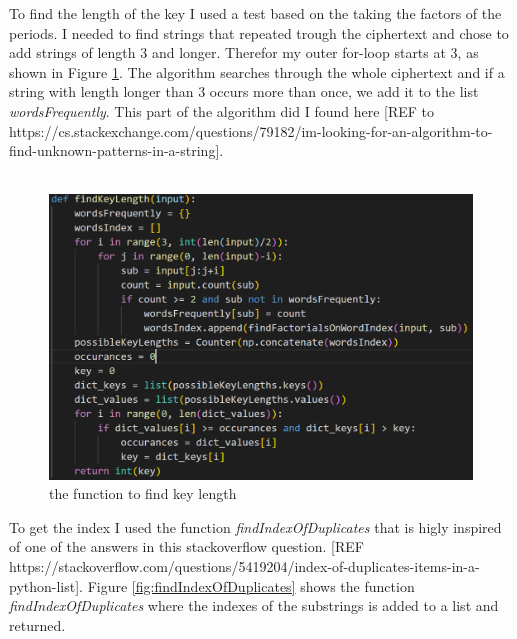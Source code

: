 \documentclass[12pt, letterpaper]{article}
\begin{document}
To find the length of the key I used a test based on the taking the factors of the periods. I needed to find strings that repeated trough the ciphertext and chose to add strings of length 3 and longer. Therefor my outer for-loop starts at 3, as shown in Figure \ref{fig:findKeyLength}. The algorithm searches through the whole ciphertext and if a string with length longer than 3 occurs more than once, we add it to the list \textit{wordsFrequently}. This part of the algorithm did I found here [REF to https://cs.stackexchange.com/questions/79182/im-looking-for-an-algorithm-to-find-unknown-patterns-in-a-string]. 
\\ \\
\begin{figure}
  \includegraphics[width=\linewidth]{code_snippets/findKeyLength.PNG}
  \caption{the function to find key length}
  \label{fig:findKeyLength}
\end{figure}

To get the index I used the function \textit{findIndexOfDuplicates} that is higly inspired of one of the answers in this stackoverflow question. [REF https://stackoverflow.com/questions/5419204/index-of-duplicates-items-in-a-python-list]. Figure \ref{fig:findIndexOfDuplicates} shows the function \textit{findIndexOfDuplicates} where the indexes of the substrings is added to a list and returned. \\ \\
\end{document}
